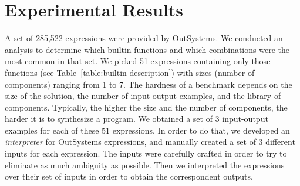 \section{Experimental Results}
\label{sec:experimental-results}

\begin{table}[t]
  \footnotesize
  \noindent{}
  \caption{Comparison between the different configurations by number of instances
    solved and running wall-clock time for solved instances (not necessarily
    matching the expected solution).}
  \label{table:comparison-configs}
\end{table}


A set of 285,522 expressions were provided by OutSystems.
We conducted an analysis to determine which builtin functions and which
combinations were the most common in that set.
We picked 51 expressions containing only those functions (see
Table~\ref{table:builtin-description}) with sizes (number of components) ranging
from 1 to 7.
The hardness of a benchmark depends on the size of the solution, the number of
input-output examples, and the library of components.
Typically, the higher the size and the number of components, the harder it is to
synthesize a program.
We obtained a set of 3 input-output examples for each of these 51 expressions.
In order to do that, we developed an \textit{interpreter} for OutSystems
expressions, and manually created a set of 3 different inputs for each
expression.
The inputs were carefully crafted in order to try to eliminate as much ambiguity
as possible.
Then we interpreted the expressions over their set of inputs in order to
obtain the correspondent outputs.

